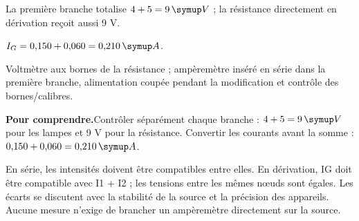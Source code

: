 \par\noindent\begin{minipage}{\linewidth}
\label{cor-defi-13}\begin{questions}
\item La première branche totalise $4+5=9\unite V$ ; la résistance directement en dérivation reçoit aussi 9 V.
\item $I_G=0{,}150+0{,}060=0{,}210\unite A$.
\item Voltmètre aux bornes de la résistance ; ampèremètre inséré en série dans la première branche, alimentation coupée pendant la modification et contrôle des bornes/calibres.
\end{questions}
\par\smallskip\noindent\textbf{Pour comprendre.}\enspace Contrôler séparément chaque branche : $4+5=9\unite V$ pour les lampes et 9 V pour la résistance. Convertir les courants avant la somme : $0{,}150+0{,}060=0{,}210\unite A$.\par
{}
\end{minipage}
\par\noindent\begin{minipage}{\linewidth}
\label{cor-activite-13}
En série, les intensités doivent être compatibles entre elles. En dérivation, IG doit être compatible avec I1 + I2 ; les tensions entre les mêmes nœuds sont égales. Les écarts se discutent avec la stabilité de la source et la précision des appareils. Aucune mesure n’exige de brancher un ampèremètre directement sur la source.\par\end{minipage}
